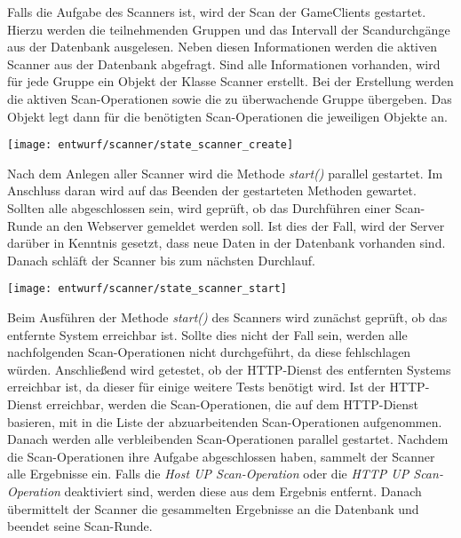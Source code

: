 Falls die Aufgabe des Scanners  ist, wird der Scan der GameClients gestartet. Hierzu werden die teilnehmenden Gruppen und das Intervall der Scandurchgänge aus der Datenbank ausgelesen. Neben diesen Informationen werden die aktiven Scanner aus der Datenbank abgefragt. Sind alle Informationen vorhanden, wird für jede Gruppe ein Objekt der Klasse Scanner erstellt. Bei der Erstellung werden die aktiven Scan-Operationen sowie die zu überwachende Gruppe übergeben. Das Objekt legt dann für die benötigten Scan-Operationen die jeweiligen Objekte an.

\begin{center}
	\texttt{[image: entwurf/scanner/state\_scanner\_create]}
	\label{fig:scanner-create-state}
\end{center}

Nach dem Anlegen aller Scanner wird die Methode \textit{start()} parallel gestartet. Im Anschluss daran wird auf das Beenden der gestarteten Methoden gewartet. Sollten alle abgeschlossen sein, wird geprüft, ob das Durchführen einer Scan-Runde an den Webserver gemeldet werden soll. Ist dies der Fall, wird der Server darüber in Kenntnis gesetzt, dass neue Daten in der Datenbank vorhanden sind. Danach schläft der Scanner bis zum nächsten Durchlauf.

\begin{minipage}{\textwidth}
	\texttt{[image: entwurf/scanner/state\_scanner\_start]}
\end{minipage}

Beim Ausführen der Methode \textit{start()} des Scanners wird zunächst geprüft, ob das entfernte System erreichbar ist. Sollte dies nicht der Fall sein, werden alle nachfolgenden Scan-Operationen nicht durchgeführt, da diese fehlschlagen würden. Anschließend wird getestet, ob der HTTP-Dienst des entfernten Systems erreichbar ist, da dieser für einige weitere Tests benötigt wird. Ist der HTTP-Dienst erreichbar, werden die Scan-Operationen, die auf dem HTTP-Dienst basieren, mit in die Liste der abzuarbeitenden Scan-Operationen aufgenommen. Danach werden alle verbleibenden Scan-Operationen parallel gestartet. Nachdem die Scan-Operationen ihre Aufgabe abgeschlossen haben, sammelt der Scanner alle Ergebnisse ein. Falls die \textit{Host UP Scan-Operation} oder die \textit{HTTP UP Scan-Operation} deaktiviert sind, werden diese aus dem Ergebnis entfernt. Danach übermittelt der Scanner die gesammelten Ergebnisse an die Datenbank und beendet seine Scan-Runde.

